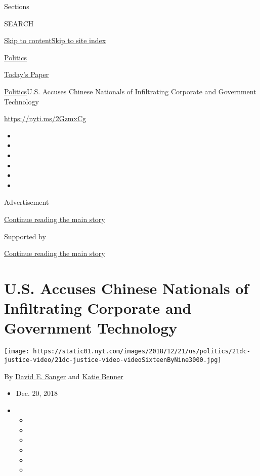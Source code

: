 Sections

SEARCH

\protect\hyperlink{site-content}{Skip to
content}\protect\hyperlink{site-index}{Skip to site index}

\href{https://www.nytimes.com/section/politics}{Politics}

\href{https://myaccount.nytimes.com/auth/login?response_type=cookie\&client_id=vi}{}

\href{https://www.nytimes.com/section/todayspaper}{Today's Paper}

\href{/section/politics}{Politics}\textbar{}U.S. Accuses Chinese
Nationals of Infiltrating Corporate and Government Technology

\url{https://nyti.ms/2GzmxCg}

\begin{itemize}
\item
\item
\item
\item
\item
\item
\end{itemize}

Advertisement

\protect\hyperlink{after-top}{Continue reading the main story}

Supported by

\protect\hyperlink{after-sponsor}{Continue reading the main story}

\hypertarget{us-accuses-chinese-nationals-of-infiltrating-corporate-and-government-technology}{%
\section{U.S. Accuses Chinese Nationals of Infiltrating Corporate and
Government
Technology}\label{us-accuses-chinese-nationals-of-infiltrating-corporate-and-government-technology}}

\texttt{[image: https://static01.nyt.com/images/2018/12/21/us/politics/21dc-justice-video/21dc-justice-video-videoSixteenByNine3000.jpg]}

By \href{https://www.nytimes.com/by/david-e-sanger}{David E. Sanger} and
\href{https://www.nytimes.com/by/katie-benner}{Katie Benner}

\begin{itemize}
\item
  Dec. 20, 2018
\item
  \begin{itemize}
  \item
  \item
  \item
  \item
  \item
  \item
  \end{itemize}
\end{itemize}

